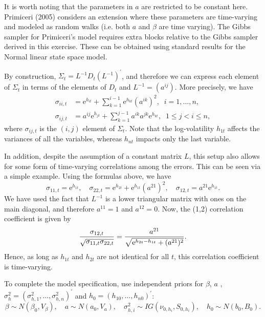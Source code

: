 \documentclass{article}
\begin{document}
It is worth noting that the parameters in $a$ are restricted to be constant
here. Primiceri (2005) considers an extension where these parameters are
time-varying and modeled as random walks (i.e. both $a$ and $\beta $ are
time varying). The Gibbs sampler for Primiceri's model requires extra blocks
relative to the Gibbs sampler derived in this exercise. These can be
obtained using standard results for the Normal linear state space model.

By construction, $\Sigma _{t}=L^{-1}D_{t}(L^{-1})^{\prime }$, and therefore
we can express each element of $\Sigma _{t}$ in terms of the elements of $%
D_{t}$ and $L^{-1}=(a^{ij})$. More precisely, we have 
\begin{align*}
\sigma _{ii,t}& =\text{e}^{h_{it}}+\sum_{k=1}^{i-1}\text{e}%
^{h_{kt}}(a^{ik})^{2},\;\;i=1,\ldots ,n, \\
\sigma _{ij,t}& =a^{ij}\text{e}^{h_{jt}}+\sum_{k=1}^{j-1}a^{ik}a^{jk}\text{e}%
^{h_{kt}},\;\;1\leq j<i\leq n,
\end{align*}%
where $\sigma _{ij,t}$ is the $(i,j)$ element of $\Sigma _{t}$. Note that
the log-volatility $h_{1t}$ affects the variances of all the variables,
whereas $h_{nt}$ impacts only the last variable.

In addition, despite the assumption of a constant matrix $L$, this setup
also allows for some form of time-varying correlations among the errors.
This can be seen via a simple example. Using the formulas above, we have 
\begin{equation*}
\sigma _{11,t}=\text{e}^{h_{1t}},\quad \sigma _{22,t}=\text{e}^{h_{2t}}+%
\text{e}^{h_{1t}}(a^{21})^{2},\quad \sigma _{12,t}=a^{21}\text{e}^{h_{1t}}.
\end{equation*}%
We have used the fact that $L^{-1}$ is a lower triangular matrix with ones
on the main diagonal, and therefore $a^{11}=1$ and $a^{12}=0$. Now, the
(1,2) correlation coefficient is given by 
\begin{equation*}
\frac{\sigma _{12,t}}{\sqrt{\sigma _{11,t}\sigma _{22,t}}}=\frac{a^{21}}{%
\sqrt{\text{e}^{h_{2t}-h_{1t}}+(a^{21})^{2}}}.
\end{equation*}%
Hence, as long as $h_{1t}$ and $h_{2t}$ are not identical for all $t$, this
correlation coefficient is time-varying.

To complete the model specification, use independent priors for $\beta $, $a$%
, $\sigma _{h}^{2}=(\sigma _{h,1}^{2},\ldots ,\sigma _{h,n}^{2})^{\prime }$
and $h_{0}=(h_{10},\ldots ,h_{n0})^{\prime }$: 
\begin{equation*}
\beta \sim N(\beta _{0},V_{\beta }),\quad a\sim N(a_{0},V_{a}),\quad \sigma
_{h,i}^{2}\sim IG(\nu _{0,h_{i}},S_{0,h_{i}}),\quad h_{0}\sim N(b_{0},B_{0}).
\end{equation*}
\end{document}

